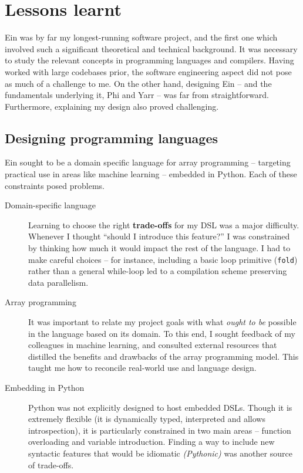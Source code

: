\needspace{2em}
\section{Lessons learnt}

Ein was by far my longest-running software project, and the first one which involved such a significant theoretical and technical background. 
It was necessary to study the relevant concepts in programming languages and compilers.
Having worked with large codebases prior, the software engineering aspect did not pose as much of a challenge to me. 
On the other hand, designing Ein -- and the fundamentals underlying it, Phi and Yarr -- was far from straightforward. 
Furthermore, explaining my design also proved challenging. 

\subsection{Designing programming languages}

Ein sought to be a domain specific language for array programming -- targeting practical use in areas like machine learning -- embedded in Python. Each of these constraints posed problems.

\begin{description}
    \item[Domain-specific language] 
    Learning to choose the right \textbf{trade-offs} for my DSL was a major difficulty. 
    Whenever I thought ``should I introduce this feature?'' I was constrained by thinking how much it would impact the rest of the language. 
    I had to make careful choices -- for instance, including a basic loop primitive (\texttt{fold}) rather than a general while-loop led to a compilation scheme preserving data parallelism.
    \item[Array programming] 
    It was important to relate my project goals with what \textit{ought to be} possible in the language based on its domain. 
    To this end, I sought feedback of my colleagues in machine learning, and consulted external resources that distilled the benefits and drawbacks of the array programming model. 
    This taught me how to reconcile real-world use and language design.
    \item[Embedding in Python] 
    Python was not explicitly designed to host embedded DSLs. 
    Though it is extremely flexible (it is dynamically typed, interpreted and allows introspection), it is particularly constrained in two main areas -- function overloading and variable introduction. 
    Finding a way to include new syntactic features that would be idiomatic \textit{(Pythonic)} was another source of trade-offs.
\end{description}

